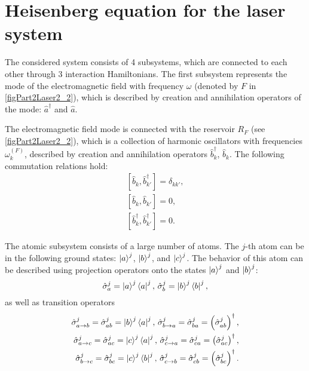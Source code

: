 \section{Heisenberg equation for the laser system}

The considered system consists of 4 subsystems, which are connected
to each other through 3 interaction Hamiltonians. The first
subsystem represents the mode of the electromagnetic field with frequency
$\omega$ (denoted by $F$ in \autoref{figPart2Laser2_2}),
which is described by creation and annihilation operators of the mode:
$\hat{a}^{\dag}$ and $\hat{a}$. 

The electromagnetic field mode is connected with
the reservoir $R_F$ (see \autoref{figPart2Laser2_2}), which
is a collection of harmonic oscillators with frequencies
$\omega_k^{(F)}$, described by creation and annihilation operators
$\hat{b}_k^{\dag}$, $\hat{b}_k$. The following
commutation relations hold:
\begin{eqnarray}
\left[\hat{b}_k, \hat{b}^{\dag}_{k'}\right] = \delta_{kk'},
\nonumber \\
\left[\hat{b}_k, \hat{b}_{k'}\right] = 0,
\nonumber \\
\left[\hat{b}^{\dag}_k, \hat{b}^{\dag}_{k'}\right] = 0.
\nonumber
\end{eqnarray}

The atomic subsystem consists of a large number of atoms. The $j$-th atom can
be in the following ground states:
$\ket{a}^j$, $\ket{b}^j$, and $\ket{c}^j$. The behavior
of this atom can be described using projection operators onto
the states $\ket{a}^j$ and $\ket{b}^j$:
\begin{equation}
\hat{\sigma}_a^j = \ket{a}^j\bra{a}^j,\,
\hat{\sigma}_b^j = \ket{b}^j\bra{b}^j,
\nonumber
\end{equation}
as well as transition operators
\begin{eqnarray}
\hat{\sigma}_{a \rightarrow b}^j = \hat{\sigma}_{ab}^j =
\ket{b}^j\bra{a}^j,\,
\hat{\sigma}_{b \rightarrow a}^j = \hat{\sigma}_{ba}^j =
\left(\hat{\sigma}_{ab}^j\right)^{\dag},
\nonumber \\
\hat{\sigma}_{a \rightarrow c}^j = \hat{\sigma}_{ac}^j =
\ket{c}^j\bra{a}^j,\,
\hat{\sigma}_{c \rightarrow a}^j = \hat{\sigma}_{ca}^j =
\left(\hat{\sigma}_{ac}^j\right)^{\dag},
\nonumber \\
\hat{\sigma}_{b \rightarrow c}^j = \hat{\sigma}_{bc}^j =
\ket{c}^j\bra{b}^j,\,
\hat{\sigma}_{c \rightarrow b}^j = \hat{\sigma}_{cb}^j =
\left(\hat{\sigma}_{bc}^j\right)^{\dag}.
\nonumber 
\end{eqnarray}

